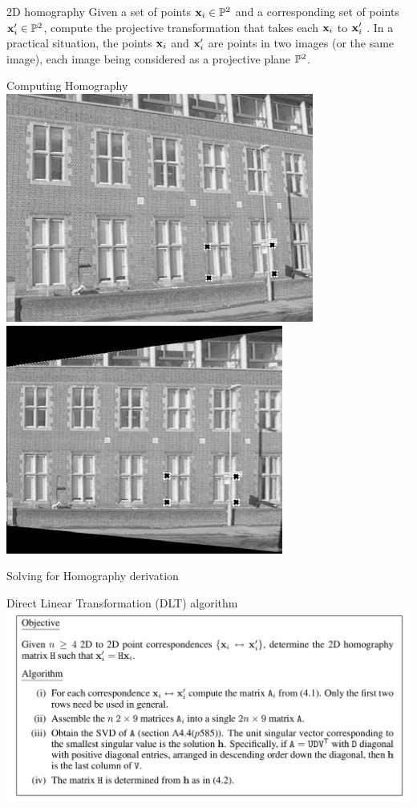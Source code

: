 \documentclass[times,t]{beamer}
\begin{document}
\begin{frame}{2D homography}
Given a set of points $\mathbf{x}_i \in \mathbb{P}^2$ and a corresponding set of
points $\mathbf{x}'_i \in \mathbb{P}^2$, compute the projective transformation that takes each
$\mathbf{x}_i$ to $\mathbf{x}'_i$ . In a practical situation, the points $\mathbf{x}_i$ and   $\mathbf{x}'_i$  are points in two images
(or the same image), each image being considered as a projective plane  $\mathbb{P}^2$.
\end{frame}

\begin{frame}{Computing Homography}
  \includegraphics[width=0.45\linewidth]{media/removing-perspective-distortion.png}
  \includegraphics[width=0.45\linewidth]{media/removing-perspective-distortion-b.png}
\end{frame}

\begin{frame}{Solving for Homography derivation}
\end{frame}

\begin{frame}{Direct Linear Transformation   (DLT) algorithm}
  \includegraphics[width=\linewidth]{media/DLT-algorithm.png}
\end{frame}
\end{document}
